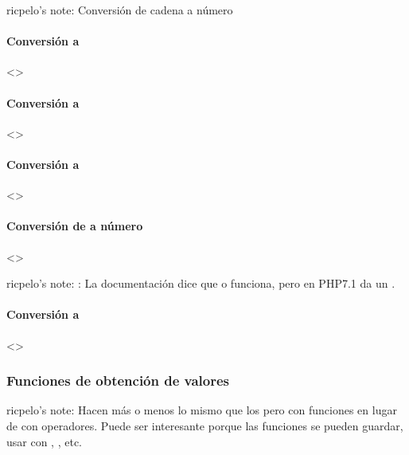 \documentclass[a4paper,12pt,spanish]{sphinxmanual}
\begin{document}
ricpelo’s note: Conversión de cadena a número


\paragraph{Conversión a }
\label{\detokenize{php:conversion-a-bool}}
\textless{}\textgreater{}


\paragraph{Conversión a }
\label{\detokenize{php:conversion-a-int}}
\textless{}\textgreater{}


\paragraph{Conversión a }
\label{\detokenize{php:conversion-a-float}}
\textless{}\textgreater{}


\paragraph{Conversión de  a número}
\label{\detokenize{php:conversion-de-string-a-numero}}
\textless{}\textgreater{}

ricpelo’s note: : La documentación dice que 
o  funciona, pero en PHP7.1 da un .


\paragraph{Conversión a }
\label{\detokenize{php:conversion-a-string}}
\textless{}\textgreater{}


\subsubsection{Funciones de obtención de valores}
\label{\detokenize{php:funciones-de-obtencion-de-valores}}
ricpelo’s note: Hacen más o menos lo mismo que los  pero con
funciones en lugar de con operadores. Puede ser interesante porque las
funciones se pueden guardar, usar con , , etc.
\end{document}
